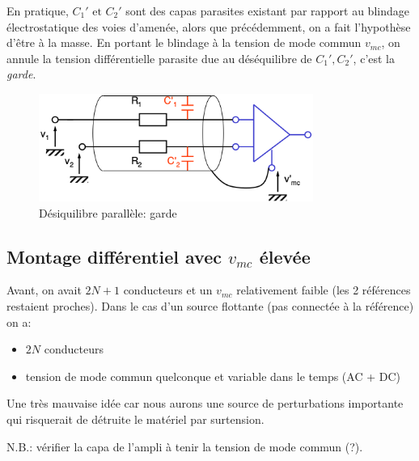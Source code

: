 En pratique, \(C_1'\text{ et }C_2'\) sont des capas parasites existant par rapport au blindage électrostatique des voies d'amenée, alors que précédemment, on a fait l'hypothèse d'être à la masse. En portant le blindage à la tension de mode commun \(v_{mc}\), on annule la tension différentielle parasite due au déséquilibre de \(C_1', C_2'\), c'est la \emph{garde}.
\begin{figure}[H] 
	\centering 
	\includegraphics[width=0.8\textwidth,height=10\baselineskip,keepaspectratio]{ch3/image20} 
	\caption{Désiquilibre parallèle: garde} 
\end{figure}
\subsection{Montage différentiel avec \(v_{mc}\) élevée}
Avant, on avait \(2N+1\) conducteurs et un \(v_{mc}\) relativement faible (les 2 références restaient proches). Dans le cas d'un source flottante (pas connectée à la référence) on a:
\begin{itemize}
	\item \(2N\) conducteurs
	\item tension de mode commun quelconque et variable dans le temps (AC + DC)
\end{itemize}
Une très mauvaise idée car nous aurons une source de perturbations importante qui risquerait de détruite le matériel par surtension.

N.B.: vérifier la capa de l'ampli à tenir la tension de mode commun (?).
